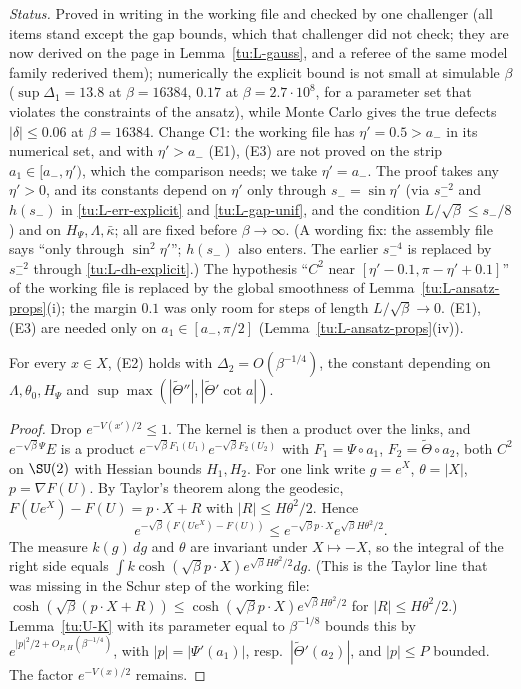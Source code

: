 \noindent\emph{Status.} Proved in writing in the working file and checked by one challenger (all items
stand except the gap bounds, which that challenger did not check; they are now derived on the page in
Lemma~\ref{tu:L-gauss}, and a referee of the same model family rederived them); numerically the explicit bound is not small at simulable $\beta$
($\sup\Delta_1=13.8$ at $\beta=16384$, $0.17$ at $\beta=2.7\cdot10^8$, for a parameter set that violates the
constraints of the ansatz), while Monte Carlo gives the true defects $|\delta|\le0.06$ at $\beta=16384$.
Change C1: the working file has $\eta'=0.5>a_-$ in its numerical set, and with $\eta'>a_-$ (E1), (E3) are not
proved on the strip $a_1\in[a_-,\eta')$, which the comparison needs; we take $\eta'=a_-$. The proof takes any
$\eta'>0$, and its constants depend on $\eta'$ only through $s_-=\sin\eta'$ (via $s_-^{-2}$ and $h(s_-)$ in
\eqref{tu:L-err-explicit} and \eqref{tu:L-gap-unif}, and the condition $L/\sqrt\beta\le s_-/8$) and on $H_\Psi,\Lambda,\bar\kappa$; all are fixed before $\beta\to\infty$. (A wording fix: the assembly
file says ``only through $\sin^2\eta'$''; $h(s_-)$ also enters. The earlier $s_-^{-4}$ is replaced by $s_-^{-2}$ through
\eqref{tu:L-dh-explicit}.) The hypothesis ``$C^2$ near
$[\eta'-0.1,\pi-\eta'+0.1]$'' of the working file is replaced by the global smoothness of
Lemma~\ref{tu:L-ansatz-props}(i); the margin $0.1$ was only room for steps of length $L/\sqrt\beta\to0$.
(E1), (E3) are needed only on $a_1\in[a_-,\pi/2]$ (Lemma~\ref{tu:L-ansatz-props}(iv)).

\begin{lemma}[(E2)]\label{tu:L-E2}
For every $x\in X$, (E2) holds with $\Delta_2=O(\beta^{-1/4})$, the constant depending on
$\Lambda,\theta_0,H_\Psi$ and $\sup\max(|\tilde\Theta''|,|\tilde\Theta'\cot a|)$.
\end{lemma}

\begin{proof}
Drop $e^{-V(x')/2}\le1$. The kernel is then a product over the links, and $e^{-\sqrt\beta\Psi}E$ is a product
$e^{-\sqrt\beta F_1(U_1)}e^{-\sqrt\beta F_2(U_2)}$ with $F_1=\Psi\circ a_1$, $F_2=\tilde\Theta\circ a_2$, both $C^2$ on
$\SU(2)$ with Hessian bounds $H_1,H_2$. For one link write $g=e^X$, $\theta=|X|$, $p=\nabla F(U)$. By Taylor's
theorem along the geodesic, $F(Ue^X)-F(U)=p\cdot X+R$ with $|R|\le H\theta^2/2$. Hence
\[
e^{-\sqrt\beta(F(Ue^X)-F(U))}\le e^{-\sqrt\beta p\cdot X}e^{\sqrt\beta H\theta^2/2}.
\]
The measure $k(g)\,dg$ and $\theta$ are invariant under $X\mapsto-X$, so the integral of the right side equals
$\int k\cosh(\sqrt\beta p\cdot X)e^{\sqrt\beta H\theta^2/2}dg$. (This is the Taylor line that was missing in the
Schur step of the working file: $\cosh(\sqrt\beta(p\cdot X+R))\le\cosh(\sqrt\beta p\cdot X)e^{\sqrt\beta H\theta^2/2}$
for $|R|\le H\theta^2/2$.) Lemma~\ref{tu:U-K} with its parameter equal to $\beta^{-1/8}$ bounds this by
$e^{|p|^2/2+O_{P,H}(\beta^{-1/4})}$, with $|p|=|\Psi'(a_1)|$, resp.\ $|\tilde\Theta'(a_2)|$, and $|p|\le P$ bounded.
The factor $e^{-V(x)/2}$ remains.
\end{proof}

